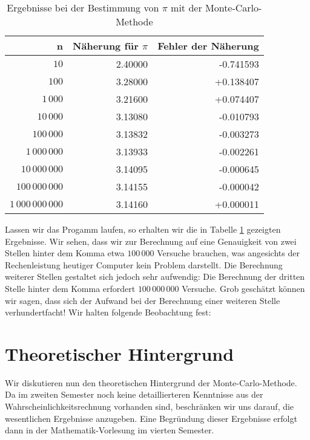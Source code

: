\begin{table}[htbp]
  \label{tab:pi}
  \centering
  \begin{tabular}[t]{|r|r|r|}
  \hline
  n & N\"aherung f\"ur $\pi$ & Fehler der N\"aherung \\
  \hline
  \hline
               $10$ & 2.40000 & -0.741593 \\
\hline
              $100$ & 3.28000 & +0.138407 \\
\hline
           $1\,000$ & 3.21600 & +0.074407 \\
\hline
          $10\,000$ & 3.13080 & -0.010793 \\
\hline
         $100\,000$ & 3.13832 & -0.003273 \\
\hline
      $1\,000\,000$ & 3.13933 & -0.002261 \\
\hline
     $10\,000\,000$ & 3.14095 & -0.000645 \\
\hline
    $100\,000\,000$ & 3.14155 & -0.000042 \\
\hline
 $1\,000\,000\,000$ & 3.14160 & +0.000011 \\
\hline
  \end{tabular}
  \caption{Ergebnisse bei der Bestimmung von $\pi$ mit der Monte-Carlo-Methode}
\end{table}

Lassen wir das Progamm laufen, so erhalten wir die in Tabelle \ref{tab:pi} gezeigten Ergebnisse.
Wir sehen, dass wir zur Berechnung auf eine Genauigkeit von zwei Stellen hinter dem Komma etwa $100\,000$
Versuche brauchen, was angesichts der Rechenleistung heutiger Computer kein Problem darstellt.  Die Berechnung
weiterer Stellen gestaltet sich jedoch sehr aufwendig:  Die Berechnung der dritten Stelle hinter dem Komma
erfordert  $100\,000\,000$ Versuche. Grob gesch\"atzt k\"onnen wir
sagen, dass sich der Aufwand bei der Berechnung einer weiteren Stelle verhundertfacht!  
Wir halten folgende Beobachtung fest:

\begin{center}
\end{center}

\section{Theoretischer Hintergrund}
Wir diskutieren nun den theoretischen Hintergrund der Monte-Carlo-Methode.  Da im zweiten Semester noch
keine detaillierteren Kenntnisse aus der Wahrscheinlichkeitsrechnung vorhanden sind, beschr\"anken wir
uns darauf, die wesentlichen Ergebnisse anzugeben.  Eine Begr\"undung dieser Ergebnisse erfolgt dann
in der Mathematik-Vorlesung im vierten Semester. 

